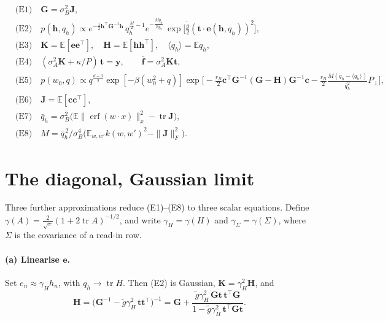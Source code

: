 \documentclass[11pt,a4paper]{article}
\newcommand{\E}{\mathbb{E}}
\newcommand{\erf}{\operatorname{erf}}
\newcommand{\tr}{\operatorname{tr}}
\begin{document}
\begin{align}
  &\text{(E1)}\quad \mathbf G=\sigma_B^2\mathbf J, \nonumber\\
  &\text{(E2)}\quad p(\mathbf h,q_h)\propto e^{-\frac12\mathbf h^\top\mathbf G^{-1}\mathbf h}\,q_h^{\frac M2-1}e^{-\frac{Mq_h}{2\bar q_h}}\,
      \exp\!\big[\tfrac{\tilde g}{2}(\mathbf t\cdot\mathbf e(\mathbf h,q_h))^2\big], \nonumber\\
  &\text{(E3)}\quad \mathbf K=\E[\mathbf e\mathbf e^\top],\quad \mathbf H=\E[\mathbf h\mathbf h^\top],\quad\langle q_h\rangle=\E q_h, \nonumber\\
  &\text{(E4)}\quad (\sigma_A^2\mathbf K+\kappa/P)\,\mathbf t=\mathbf y,\qquad \bar{\mathbf f}=\sigma_A^2\mathbf K\mathbf t, \nonumber\\
  &\text{(E5)}\quad p(w_0,q)\propto q^{\frac{d-3}{2}}\exp[-\beta(w_0^2+q)]
      \exp\Big[-\tfrac{r_B}{2}\mathbf c^\top \mathbf G^{-1}(\mathbf G-\mathbf H)\mathbf G^{-1}\mathbf c
      -\tfrac{r_B}{2}\tfrac{M(\bar q_h-\langle q_h\rangle)}{\bar q_h^2}P_\perp\Big], \nonumber\\
  &\text{(E6)}\quad \mathbf J=\E[\mathbf c\mathbf c^\top], \nonumber\\
  &\text{(E7)}\quad \bar q_h=\sigma_B^2\big(\E\|\erf(w\cdot x)\|_x^2-\tr \mathbf J\big), \nonumber\\
  &\text{(E8)}\quad M=\bar q_h^{\,2}\big/\sigma_B^4\big(\E_{w,w'}k(w,w')^2-\|\mathbf J\|_F^2\big). \nonumber
\end{align}

\section{The diagonal, Gaussian limit}\label{sec:reduce}
Three further approximations reduce (E1)--(E8) to three scalar equations.
Define $\gamma(A)=\frac{2}{\sqrt\pi}(1+2\tr A)^{-1/2}$, and write $\gamma_H=\gamma(H)$ and $\gamma_\Sigma=\gamma(\Sigma)$, where $\Sigma$ is
the covariance of a read-in row.

\paragraph{(a) Linearise $\mathbf e$.}
Set $e_n\approx\gamma_H h_n$, with $q_h\to\tr H$.
Then (E2) is Gaussian, $\mathbf K=\gamma_H^2\mathbf H$, and
\begin{equation}
  \mathbf H=\big(\mathbf G^{-1}-\tilde g\gamma_H^2\,\mathbf t\mathbf t^\top\big)^{-1}
     =\mathbf G+\frac{\tilde g\gamma_H^2\,\mathbf G\mathbf t\,\mathbf t^\top \mathbf G}{1-\tilde g\gamma_H^2\,\mathbf t^\top \mathbf G\mathbf t}.
  \label{eq:Hgauss}
\end{equation}
\end{document}
